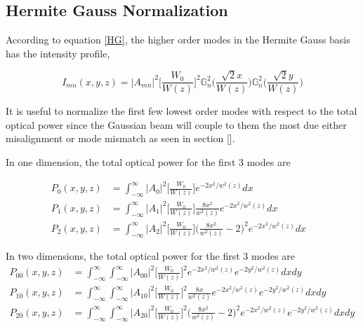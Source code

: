 \begin{appendices}
	\chapter{Hermite Gauss Normalization}
	According to equation \ref{HG}, the higher order modes in the Hermite Gauss basis has the intensity profile,
	
	\begin{equation}
		I_{mn} (x,y,z) = \vert A_{mn} \vert^2 \bigg[ \frac{W_0}{W(z)} \bigg]^2  \mathbb{G}^2_n\Bigg( \frac{\sqrt{2}x}{W(z)} \Bigg) \mathbb{G}^2_n\Bigg( \frac{\sqrt{2}y}{W(z)} \Bigg)
	\end{equation}

	It is useful to normalize the first few lowest order modes with respect to the total optical power since the Gaussian beam will couple to them the most due either misalignment or mode mismatch as seen in section [].
	
	In one dimension, the total optical power for the first 3 modes are
	
	\begin{equation}
	\label{HGNormalInt1D}
	\begin{aligned}
		P_{0}(x,y,z) 	& 	=	\int_{-\infty}^{\infty}  \vert A_{0} \vert^2   \bigg[ \frac{W_0}{W(z)} \bigg] e^{-2x^2/w^2(z)} dx	&
	\\	P_{1}(x,y,z)	&	=	\int_{-\infty}^{\infty}  \vert A_{1} \vert^2  \bigg[ \frac{W_0}{W(z)} \bigg] \frac{8x^2}{w^2(z)} 	
								e^{-2x^2/w^2(z)}dx &
	\\	P_{2}(x,y,z)	&	= 	\int_{-\infty}^{\infty}  \vert A_{2} \vert^2   \bigg[ \frac{W_0}{W(z)} \bigg] \bigg(\frac{8x^2}{w^2(z)}	-2\bigg)^2e^{-2x^2/w^2(z)}dx
	\end{aligned}
	\end{equation}
	
	In two dimensions, the total optical power for the first 3 modes are
	\begin{equation}
	\label{HGNormalInt2D}
	\begin{aligned}
		P_{00}(x,y,z) 	& 	=	 \int_{-\infty}^{\infty} \int_{-\infty}^{\infty}  \vert A_{00} \vert^2   \bigg[ \frac{W_0}{W(z)} \bigg]^2 e^{-2x^2/w^2(z)}e^{-2y^2/w^2(z)} dx dy&
	\\	P_{10}(x,y,z)	&	=	\int_{-\infty}^{\infty} \int_{-\infty}^{\infty}  \vert A_{10} \vert^2  \bigg[ \frac{W_0}{W(z)} \bigg]^2 \frac{8x}{w^2(z)} e^{-2x^2/w^2(z)}e^{-2y^2/w^2(z)} dx dy&
	\\	P_{20}(x,y,z)	&	= 	\int_{-\infty}^{\infty} \int_{-\infty}^{\infty}  \vert A_{20} \vert^2   \bigg[ \frac{W_0}{W(z)} \bigg]^2 \bigg(\frac{8x^2}{w^2(z)} - 2\bigg)^2 e^{-2x^2/w^2(z)}e^{-2y^2/w^2(z)} dx dy
	\end{aligned}
	\end{equation}
	

\end{appendices}
